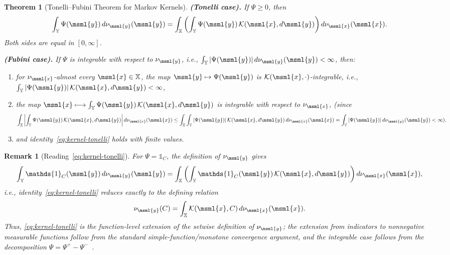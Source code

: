 \documentclass[opre,sglanonrev]{informs4}
\newtheorem{theorem}{Theorem}
\newtheorem{remark}{Remark}
\newcommand{\mK}{\mathcal{K}}          %
\newcommand{\mbX}{\mathbb{X}}
\newcommand{\mbY}{\mathbb{Y}}
\newcommand{\ind}{\mathds{1}}
\begin{document}
{\begin{APPENDICES}
\begin{itemize}[leftmargin=1em]
\begin{theorem}[Tonelli--Fubini Theorem for Markov Kernels]
\noindent\textbf{(Tonelli case).}
If \(\Psi\ge 0\), then
\begin{equation}\label{eq:kernel-tonelli}
\int_{\mbY} \Psi(\msml{y})\,d\nu_\msml{y}(\msml{y})
=
\int_{\mbX}
     \left(\int_{\mbY} \Psi(\msml{y})\,\mK(\msml{x},d\msml{y})\right)
     d\nu_\msml{x}(\msml{x}).
\end{equation}
Both sides are equal in \([0,\infty]\).

\medskip

\noindent\textbf{(Fubini case).}
If \(\Psi\) is integrable with respect to \(\nu_\msml{y}\), i.e.,
\(\int_\mbY |\Psi(\msml{y})|\,d\nu_\msml{y}(\msml{y}) < \infty\), then:
\begin{enumerate}[label=\textit{\roman*)},leftmargin=1em]
\item for \(\nu_\msml{x}\)-almost every \(\msml{x}\in \mbX\), the map
      \(\msml{y}\mapsto \Psi(\msml{y})\) is
      \(\mK(\msml{x},\cdot)\)-integrable, i.e.,
      \(\int_\mbY |\Psi(\msml{y})| \, \mK(\msml{x}, d\msml{y}) < \infty\),
\item the map \(\msml{x} \longmapsto \int_\mbY \Psi(\msml{y})\,\mK(\msml{x},d\msml{y})\)
is integrable with respect to \(\nu_\msml{x}\), (since
\[
\int_\mbX
\left|
\int_\mbY \Psi(\msml{y})\,\mK(\msml{x},d\msml{y})
\right|
d\nu_\msml{x}(\msml{x})
\le
\int_\mbX\int_\mbY
|\Psi(\msml{y})|\,\mK(\msml{x},d\msml{y})\,d\nu_\msml{x}(\msml{x})
=
\int_\mbY|\Psi(\msml{y})|\,d\nu_\msml{y}(\msml{y})
<\infty).
\]
\item and identity~\eqref{eq:kernel-tonelli} holds with finite values.
\end{enumerate}
\end{theorem}

\begin{remark}[Reading~\eqref{eq:kernel-tonelli}]
For \(\Psi=\ind_C\), the definition of \(\nu_\msml{y}\) gives
\[
\int_{\mbY}\ind_C(\msml{y})\,d\nu_\msml{y}(\msml{y})
=
\int_{\mbX}
\left(\int_{\mbY}\ind_C(\msml{y})\,\mK(\msml{x},d\msml{y})\right)
d\nu_\msml{x}(\msml{x}),
\]
i.e., identity~\eqref{eq:kernel-tonelli} reduces exactly to the
defining relation
\[
\nu_\msml{y}(C)
=
\int_{\mbX}\mK(\msml{x},C)\,d\nu_\msml{x}(\msml{x}).
\]
Thus, \eqref{eq:kernel-tonelli} is the function-level extension of the setwise
definition of \(\nu_\msml{y}\); the extension from indicators to nonnegative
measurable functions follow from the standard simple-function/monotone
convergence argument, and the integrable case follows from the decomposition
\(\Psi=\Psi^+-\Psi^-\)~\cite{folland1999real}.
\end{remark}



\end{itemize}
\end{APPENDICES}}
\end{document}
